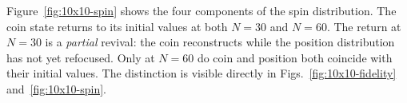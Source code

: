 Figure~\ref{fig:10x10-spin} shows the four components of
the spin distribution. The coin state returns to its initial
values at both $N = 30$ and $N = 60$. The return at
$N = 30$ is a \emph{partial} revival: the coin reconstructs
while the position distribution has not yet refocused. Only
at $N = 60$ do coin and position both coincide with their
initial values. The distinction is visible directly in
Figs.~\ref{fig:10x10-fidelity} and~\ref{fig:10x10-spin}.
